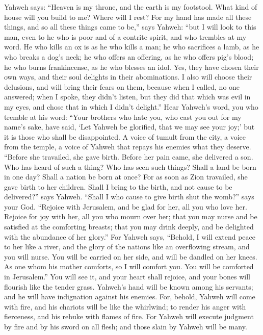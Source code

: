  Yahweh says: ``Heaven is my throne, and the earth is my
footstool. What kind of house will you build to me? Where will I rest?
 For my hand has made all these things, and so all these
things came to be,'' says Yahweh: ``but I will look to this man, even to
he who is poor and of a contrite spirit, and who trembles at my word.
 He who kills an ox is as he who kills a man; he who
sacrifices a lamb, as he who breaks a dog's neck; he who offers an
offering, as he who offers pig's blood; he who burns frankincense, as he
who blesses an idol. Yes, they have chosen their own ways, and their
soul delights in their abominations.  I also will choose
their delusions, and will bring their fears on them, because when I
called, no one answered; when I spoke, they didn't listen, but they did
that which was evil in my eyes, and chose that in which I didn't
delight.''  Hear Yahweh's word, you who tremble at his
word: ``Your brothers who hate you, who cast you out for my name's sake,
have said, `Let Yahweh be glorified, that we may see your joy;' but it
is those who shall be disappointed.  A voice of tumult
from the city, a voice from the temple, a voice of Yahweh that repays
his enemies what they deserve.  ``Before she travailed,
she gave birth. Before her pain came, she delivered a son.
 Who has heard of such a thing? Who has seen such things?
Shall a land be born in one day? Shall a nation be born at once? For as
soon as Zion travailed, she gave birth to her children. 
Shall I bring to the birth, and not cause to be delivered?'' says
Yahweh. ``Shall I who cause to give birth shut the womb?'' says your
God.  ``Rejoice with Jerusalem, and be glad for her, all
you who love her. Rejoice for joy with her, all you who mourn over her;
 that you may nurse and be satisfied at the comforting
breasts; that you may drink deeply, and be delighted with the abundance
of her glory.''  For Yahweh says, ``Behold, I will extend
peace to her like a river, and the glory of the nations like an
overflowing stream, and you will nurse. You will be carried on her side,
and will be dandled on her knees.  As one whom his mother
comforts, so I will comfort you. You will be comforted in Jerusalem.''
 You will see it, and your heart shall rejoice, and your
bones will flourish like the tender grass. Yahweh's hand will be known
among his servants; and he will have indignation against his enemies.
 For, behold, Yahweh will come with fire, and his
chariots will be like the whirlwind; to render his anger with
fierceness, and his rebuke with flames of fire.  For
Yahweh will execute judgment by fire and by his sword on all flesh; and
those slain by Yahweh will be many.


